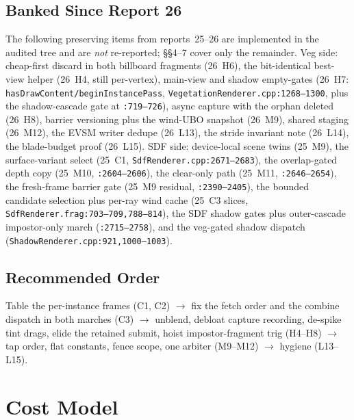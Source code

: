 \documentclass[11pt,a4paper]{article}
\begin{document}
\subsection{Banked Since Report 26}
\label{sec:banked}

The following preserving items from reports~25--26 are implemented in the
audited tree and are \emph{not} re-reported; \S\S4--7 cover only the
remainder. Veg side: cheap-first discard in both billboard fragments
(26~H6), the bit-identical best-view helper (26~H4, still per-vertex),
main-view and shadow empty-gates (26~H7:
\texttt{hasDrawContent/beginInstancePass},
\texttt{VegetationRenderer.cpp:1268--1300}, plus the shadow-cascade gate at
\texttt{:719--726}), async capture with the orphan deleted (26~H8),
barrier versioning plus the wind-UBO snapshot (26~M9), shared staging
(26~M12), the EVSM writer dedupe (26~L13), the stride invariant note
(26~L14), the blade-budget proof (26~L15). SDF side: device-local scene
twins (25~M9), the surface-variant select (25~C1,
\texttt{SdfRenderer.cpp:2671--2683}), the overlap-gated depth copy (25~M10,
\texttt{:2604--2606}), the clear-only path (25~M11, \texttt{:2646--2654}),
the fresh-frame barrier gate (25~M9 residual, \texttt{:2390--2405}), the
bounded candidate selection plus per-ray wind cache (25~C3 slices,
\texttt{SdfRenderer.frag:703--709,788--814}), the SDF shadow gates plus
outer-cascade impostor-only march (\texttt{:2715--2758}), and the veg-gated
shadow dispatch (\texttt{ShadowRenderer.cpp:921,1000--1003}).

\subsection{Recommended Order}

Table the per-instance frames (C1, C2) $\rightarrow$ fix the fetch order
and the combine dispatch in both marches (C3) $\rightarrow$ unblend,
debloat capture recording, de-spike tint drags, elide the retained submit,
hoist impostor-fragment trig (H4--H8) $\rightarrow$ tap order, flat
constants, fence scope, one arbiter (M9--M12) $\rightarrow$ hygiene
(L13--L15).

\section{Cost Model}
\end{document}
